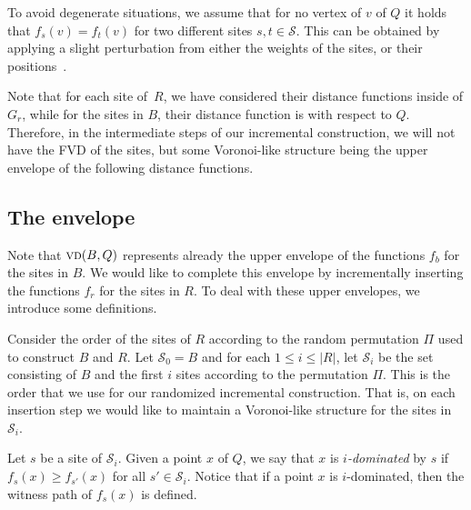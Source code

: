 \documentclass[a4paper,UKenglish]{socg-lipics-v2018}
\newcommand{\idom}[1][i]{${#1}$-dominated\xspace}
\newcommand{\s}{\mathcal S}
\newcommand{\vd}[2][P]{\textsc{vd}(#2, #1)}
\begin{document}
To avoid degenerate situations, we assume that for no vertex of $v$ of $Q$ it holds that $f_s(v) = f_t(v)$ for two different sites $s,t\in \s$. 
This can be obtained by applying a slight perturbation from either the weights of the sites, or their positions~\cite{edelsbrunner1990simulation}.

Note that for each site of~$R$, we have considered their distance functions inside of $G_r$, while for the sites in $B$, their distance function is with respect to $Q$.
Therefore, in the intermediate steps of our incremental construction, we will not have the FVD of the sites, but some Voronoi-like structure being the upper envelope of the following distance functions.



\subsection{The envelope}
Note that $\vd[Q]{B}$ represents already the upper envelope of the functions $f_b$ for the sites in $B$. 
We would like to complete this envelope by incrementally inserting the functions $f_r$ for the sites in $R$.
To deal with these upper envelopes, we introduce some definitions.




Consider the order of the sites of $R$ according to the random permutation $\Pi$ used to construct $B$ and $R$.
Let $\s_0 = B$ and for each $1\leq i\leq |R|$, let $\s_i$ be the set consisting of $B$ and the first $i$ sites according to the permutation $\Pi$.
This is the order that we use for our randomized incremental construction. 
That is, on each insertion step we would like to maintain a Voronoi-like structure for the sites in $\s_i$.

Let $s$ be a site of $\s_i$.
Given a point $x$ of $Q$, we say that $x$ is \emph{\idom} by $s$ if $f_s(x) \geq f_{s'}(x)$ for all $s'\in \s_i$.
Notice that if a point $x$ is \idom, then the witness path of $f_s(x)$ is defined. 
\end{document}
